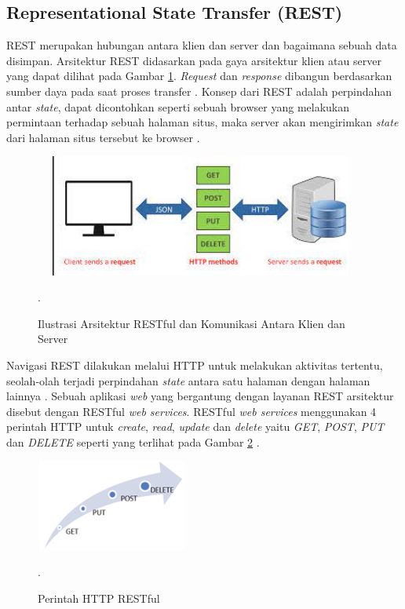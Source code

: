\subsection{Representational State Transfer (REST)}
REST merupakan hubungan antara klien dan server dan bagaimana sebuah data disimpan. Arsitektur REST didasarkan pada gaya arsitektur klien atau server yang dapat dilihat pada Gambar \ref{restful}. \textit{Request} dan \textit{response} dibangun berdasarkan sumber daya pada saat proses transfer \citep{HaliliRamadani2018}. Konsep dari REST adalah perpindahan antar \textit{state}, dapat dicontohkan seperti sebuah browser yang melakukan permintaan terhadap sebuah halaman situs, maka server akan mengirimkan \textit{state} dari halaman situs tersebut ke browser \citep{Rahman2013}.
\begin{figure}[H]
	\centering
	\shadowbox
	{\includegraphics [width = 11cm, height= 4cm]{gambar/restful.jpg}}
	\caption
	{Ilustrasi Arsitektur RESTful dan Komunikasi Antara Klien dan Server \citep{HaliliRamadani2018}}.
	\label{restful}
\end{figure}
\par Navigasi REST dilakukan melalui HTTP untuk melakukan aktivitas tertentu, seolah-olah terjadi perpindahan \textit{state} antara satu halaman dengan halaman lainnya \citep{Rahman2013}. Sebuah aplikasi \textit{web} yang bergantung dengan layanan REST arsitektur disebut dengan RESTful \textit{web services}. RESTful \textit{web services} menggunakan 4 perintah HTTP untuk \textit{create}, \textit{read}, \textit{update} dan \textit{delete} yaitu \textit{GET}, \textit{POST}, \textit{PUT} dan \textit{DELETE} seperti yang terlihat pada Gambar \ref{httprestful} \citep{sinha2014}.
\begin{figure}[H]
	\centering
	\shadowbox
	{\includegraphics [width = 5cm, height= 3cm]{gambar/httprestful}}
	\caption{Perintah HTTP RESTful \citep{sinha2014}}.
	\label{httprestful}
\end{figure}

